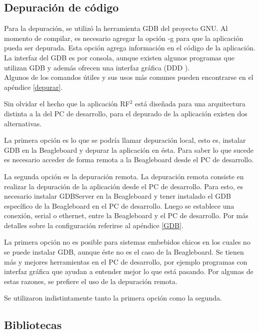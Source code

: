 \subsection{Depuración de código}
Para la depuración, se utilizó la herramienta GDB del proyecto GNU. 
Al momento de compilar, es necesario agregar la opción -g para que la aplicación pueda ser depurada. Esta opción agrega información en el código de la aplicación.
La interfaz del GDB es por consola, aunque existen algunos programas que utilizan GDB y además ofrecen una interfaz gráfica (DDD \cite{DDD}). \\
Algunos de los comandos útiles y sus usos más comunes pueden encontrarse en el apéndice \ref{depurar}.


\bigskip
Sin olvidar el hecho que la aplicación RF$^{2}$ está diseñada para una arquitectura distinta a la del PC de desarrollo, para el depurado de la aplicación existen dos alternativas. 

La primera opción es lo que se podría llamar depuración local, esto es, instalar GDB en la Beagleboard y depurar la aplicación en ésta. Para saber lo que sucede es necesario acceder de forma remota a la Beagleboard desde el PC de desarrollo. 

La segunda opción es la depuración remota. La depuración remota consiste en realizar la depuración de la aplicación desde el PC de desarrollo. Para esto, es necesario instalar GDBServer en la Beagleboard y tener instalado el GDB específico de la Beagleboard en el PC de desarrollo. Luego se establece una conexión, serial o ethernet, entre la Beagleboard y el PC de desarrollo. Por más detalles sobre la configuración referirse al apéndice \ref{GDB}.

\bigskip
La primera opción no es posible para sistemas embebidos chicos en los cuales no se puede instalar GDB, aunque éste no es el caso de la Beagleboard. 
Se tienen más y mejores herramientas en el PC de desarrollo, por ejemplo programas con interfaz gráfica que ayudan a entender mejor lo que está pasando. Por algunas de estas razones, se prefiere el uso de la depuración remota. 

\bigskip
Se utilizaron indistintamente tanto la primera opción como la segunda.

\subsection{Bibliotecas}

